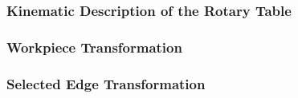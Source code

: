 \subsubsection{Kinematic Description of the Rotary Table}
\subsubsection{Workpiece Transformation}
\subsubsection{Selected Edge Transformation}
